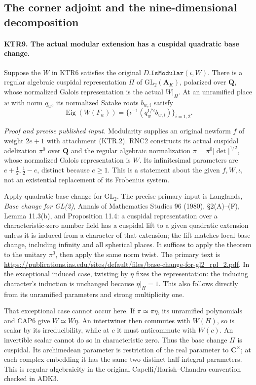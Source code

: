 \subsection{The corner adjoint and the nine-dimensional decomposition}

\paragraph{KTR9. The actual modular extension has a cuspidal quadratic base change.}
\label{claim:KTR9}
Suppose the \(W\) in KTR6 satisfies the original
\(D.\texttt{IsModular}(\iota,W)\).  There is a regular
algebraic cuspidal representation \(\Pi\) of
\(\mathrm{GL}_2(\mathbf A_K)\), polarized over \(\mathbf Q\),
whose normalized Galois representation is the actual \(W|_H\).
At an unramified place \(w\) with norm \(q_w\), its
normalized Satake roots \(b_{w,i}\) satisfy
\[
       \operatorname{Eig}(W(F_w))
                  =\{\iota^{-1}(q_w^{1/2}b_{w,i})\}_{i=1,2}.
 \tag{KTR.14}
\]

\emph{Proof and precise published input.}
Modularity supplies an original newform \(f\) of weight
\(2e+1\) with attachment (KTR.2).  RNC2 constructs its actual
cuspidal adelization \(\pi^0\) over \(\mathbf Q\) and
the regular algebraic normalization
\(\pi=\pi^0|\det|^{1/2}\), whose normalized Galois
representation is \(W\).  Its infinitesimal parameters are
\(e+\tfrac12,\tfrac12-e\), distinct because \(e\ge1\).
This is a statement about the given \(f,W,\iota\), not an
existential replacement of its Frobenius system.

Apply quadratic base change for \(\mathrm{GL}_2\).
The precise primary input is Langlands, \emph{Base change for
GL(2)}, Annals of Mathematics Studies 96 (1980),
\S2(A)--(F), Lemma 11.3(b), and Proposition 11.4:
a cuspidal representation over a characteristic-zero number
field has a cuspidal lift to a given quadratic extension unless
it is induced from a character of that extension; the lift
matches local base change, including infinity and all spherical
places.  It suffices to apply the theorem to the unitary
\(\pi^0\), then apply the same norm twist.
The primary text is
\url{https://publications.ias.edu/sites/default/files/base-change-for-gl2_rpl_2.pdf}.
In the exceptional induced case, twisting by \(\eta\) fixes
the representation: the inducing character's induction is
unchanged because \(\eta|_H=1\).  This also follows directly
from its unramified parameters and strong multiplicity one.

That exceptional case cannot occur here.  If
\(\pi\simeq\pi\eta\), its unramified polynomials and
CAP6 give \(W\simeq W\eta\).  An intertwiner then commutes
with \(W(H)\), so is scalar by its irreducibility, while at
\(c\) it must anticommute with \(W(c)\).  An invertible
scalar cannot do so in characteristic zero.  Thus the base change
\(\Pi\) is cuspidal.  Its archimedean parameter is restriction
of the real parameter to \(\mathbf C^\times\); at each
complex embedding it has the same two distinct half-integral
parameters.  This is regular algebraicity in the original
Capelli/Harish--Chandra convention checked in ADK3.

